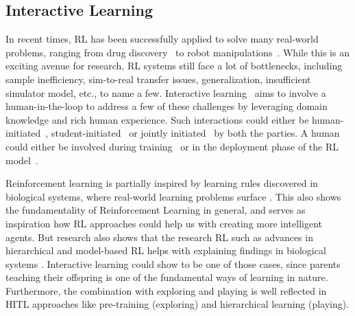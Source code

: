 \documentclass[twoside,11pt]{article}
\begin{document}
\subsection{Interactive Learning}


In recent times, RL has been successfully applied to solve many real-world problems, ranging from drug discovery~\citep{popova2018deep} to robot manipulations~\citep{nguyen2019review}. While this is an exciting avenue for research, RL systems still face a lot of bottlenecks, including sample inefficiency, sim-to-real transfer issues, generalization, insufficient simulator model, etc., to name a few. Interactive learning~\citep{Arzate:2020:SurveyInteractiveRL} aims to involve a human-in-the-loop to address a few of these challenges by leveraging domain knowledge and rich human experience. Such interactions could either be human-initiated~\citep{torrey2013teaching}, student-initiated~\citep{da2020uncertainty} or jointly initiated~\citep{amir2016interactive} by both the parties. A human could either be involved during training~\citep{Knox:2008:TAMER} or in the deployment phase of the RL model~\citep{guo2021edge}. 

Reinforcement learning is partially inspired by learning rules discovered in biological systems, where real-world learning problems surface \citep{NeftciAverbeck:2019:RLBiologicalSystems}. This also shows the fundamentality of Reinforcement Learning in general, and serves as inspiration how RL approaches could help us with creating more intelligent agents. But research also shows that the research RL such as advances in hierarchical and model-based RL helps with explaining findings in biological systems \citep{ShteingartLoewenstein:2014:RLHumanBehavior}. Interactive learning could show to be one of those cases, since parents teaching their offspring is one of the fundamental ways of learning in nature. Furthermore, the combination with exploring and playing is well reflected in HITL approaches like pre-training (exploring) and hierarchical learning (playing).
\end{document}
